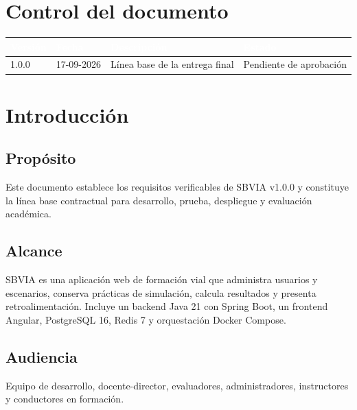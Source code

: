 \documentclass[11pt,a4paper]{article}
\begin{document}
\newpage
\tableofcontents
\newpage

\section*{Control del documento}

\begin{table}[h]
    \centering
    \renewcommand{\arraystretch}{1.5}
    \begin{tabularx}{\textwidth}{@{}|l|l|X|l|@{}}
        \hline
        \rowcolor{uteqblue}
        \textcolor{white}{\textbf{Versión}} & \textcolor{white}{\textbf{Fecha}} & \textcolor{white}{\textbf{Descripción}} & \textcolor{white}{\textbf{Estado}} \\ \hline
        1.0.0 & 17-09-2026 & Línea base de la entrega final & Pendiente de aprobación \\ \hline
    \end{tabularx}
\end{table}

\newpage

\section{Introducción}

\subsection{Propósito}
Este documento establece los requisitos verificables de SBVIA v1.0.0 y constituye la línea base contractual para desarrollo, prueba, despliegue y evaluación académica.

\subsection{Alcance}
SBVIA es una aplicación web de formación vial que administra usuarios y escenarios, conserva prácticas de simulación, calcula resultados y presenta retroalimentación. Incluye un backend Java 21 con Spring Boot, un frontend Angular, PostgreSQL 16, Redis 7 y orquestación Docker Compose.

\subsection{Audiencia}
Equipo de desarrollo, docente-director, evaluadores, administradores, instructores y conductores en formación.
\end{document}
